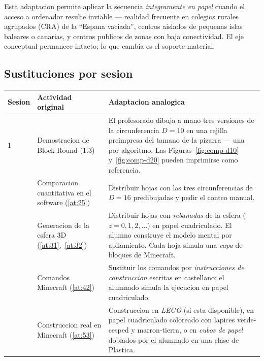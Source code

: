 \documentclass[12pt,a4paper]{scrartcl}
\begin{document}
Esta adaptacion permite aplicar la secuencia \emph{integramente en papel} cuando el acceso a ordenador resulte inviable --- realidad frecuente en colegios rurales agrupados (CRA) de la \enquote{Espana vaciada}, centros aislados de pequenas islas baleares o canarias, y centros publicos de zonas con baja conectividad. El eje conceptual permanece intacto; lo que cambia es el soporte material.

\subsection{Sustituciones por sesion}

\begin{center}
\small
\begin{tabularx}{\textwidth}{@{}p{}p{}X@{}}
\toprule
\textbf{Sesion} & \textbf{Actividad original} & \textbf{Adaptacion analogica} \\
\midrule
1 & Demostracion de Block Round (1.3) & El profesorado dibuja a mano tres versiones de la circunferencia $D = 10$ en una rejilla preimpresa del tamano de la pizarra --- una por algoritmo. Las Figuras~\ref{fig:comp-d10} y~\ref{fig:comp-d20} pueden imprimirse como referencia. \\
\addlinespace[3pt]
2 & Comparacion cuantitativa en el software (\ref{at:25}) & Distribuir hojas con las tres circunferencias de $D = 16$ predibujadas y pedir el conteo manual. \\
\addlinespace[3pt]
3 & Generacion de la esfera 3D (\ref{at:31},~\ref{at:32}) & Distribuir hojas con \emph{rebanadas} de la esfera ($z = 0, 1, 2, \ldots$) en papel cuadriculado. El alumno construye el modelo mental por apilamiento. Cada hoja simula una \emph{capa} de bloques de Minecraft. \\
\addlinespace[3pt]
4 & Comandos Minecraft (\ref{at:42}) & Sustituir los comandos por \emph{instrucciones de construccion} escritas en castellano; el alumnado simula la ejecucion en papel cuadriculado. \\
\addlinespace[3pt]
5 & Construccion real en Minecraft (\ref{at:53}) & Construccion en \emph{LEGO} (si esta disponible), en papel cuadriculado coloreado con lapices verde-cesped y marron-tierra, o en \emph{cubos de papel} doblados por el alumnado en una clase de Plastica. \\
\bottomrule
\end{tabularx}
\end{center}
\end{document}
